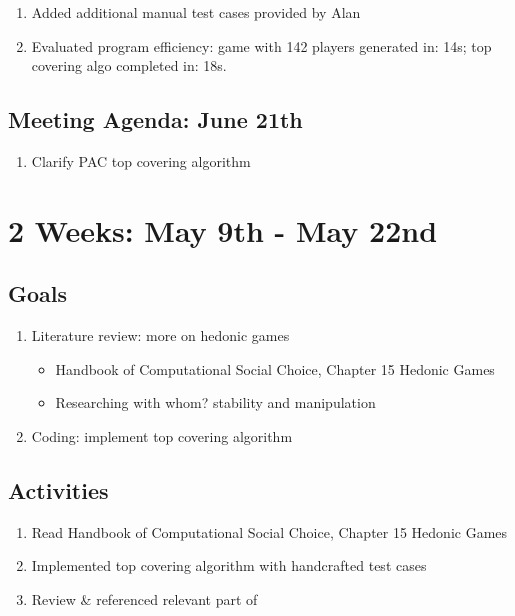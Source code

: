 \documentclass[a4paper]{article}
\begin{document}
\begin{enumerate}
  \item Added additional manual test cases provided by Alan
  \item Evaluated program efficiency: game with 142 players generated in: 14s; top covering algo completed in: 18s.
\end{enumerate}

\subsection*{Meeting Agenda: June 21th}

\begin{enumerate}
  \item Clarify PAC top covering algorithm
\end{enumerate}

\section*{2 Weeks: May 9th - May 22nd}

\subsection*{Goals}

\begin{enumerate}
  \item Literature review: more on hedonic games
  \begin{itemize}
    \item Handbook of Computational Social Choice, Chapter 15 Hedonic Games \cite{aziz_savani_moulin_2016}
    \item Researching with whom? stability and manipulation \cite{ALCALDE2004869}
  \end{itemize}

  \item Coding: implement top covering algorithm

\end{enumerate}

\subsection*{Activities}

\begin{enumerate}
  \item Read Handbook of Computational Social Choice, Chapter 15 Hedonic Games \cite{aziz_savani_moulin_2016}
  \item Implemented top covering algorithm with handcrafted test cases
  \item Review \& referenced relevant part of \cite{ALCALDE2004869}
\end{enumerate}
\end{document}
